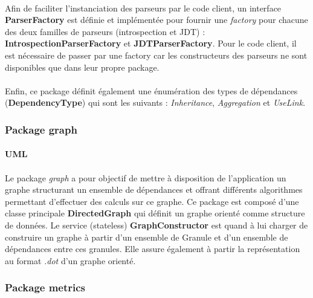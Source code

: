 \documentclass{scrartcl}
\begin{document}
    \paragraph{} Afin de faciliter l'instanciation des parseurs par le code client, un interface \textbf{ParserFactory} est définie et implémentée pour fournir une \emph{factory} pour chacune des deux familles de parseurs (introspection et JDT) : \textbf{IntrospectionParserFactory} et \textbf{JDTParserFactory}. Pour le code client, il est nécessaire de passer par une factory car les constructeurs des parseurs ne sont disponibles que dans leur propre package.
    
    \paragraph{} Enfin, ce package définit également une énumération des types de dépendances (\textbf{DependencyType}) qui sont les suivants : \emph{Inheritance}, \emph{Aggregation} et \emph{UseLink}.
    
\subsubsection{Package graph}
    \paragraph{UML}
    \paragraph{}Le package \emph{graph} a pour objectif de mettre à disposition de l’application un graphe structurant un ensemble de dépendances et offrant différents algorithmes permettant d’effectuer des calculs sur ce graphe. Ce package est composé d’une classe principale \textbf{DirectedGraph} qui définit un graphe orienté comme structure de données.
    Le service (stateless) \textbf{GraphConstructor} est quand à lui charger de construire un graphe à partir d’un ensemble de Granule et d’un ensemble de dépendances entre ces granules. Elle assure également à partir  la représentation au format \emph{.dot} d'un graphe orienté.
    
    
\subsubsection{Package metrics}
    
\end{document}
